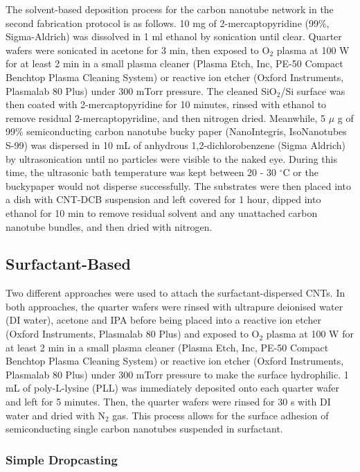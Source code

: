 \documentclass[
  a4paper,
]{scrbook}
\begin{document}
The solvent-based deposition process for the carbon nanotube network in
the second fabrication protocol is as follows. 10 mg of
2-mercaptopyridine (99\%, Sigma-Aldrich) was dissolved in 1 ml ethanol
by sonication until clear. Quarter wafers were sonicated in acetone for
3 min, then exposed to O\(_2\) plasma at 100 W for at least 2 min in a
small plasma cleaner (Plasma Etch, Inc, PE-50 Compact Benchtop Plasma
Cleaning System) or reactive ion etcher (Oxford Instruments, Plasmalab
80 Plus) under 300 mTorr pressure. The cleaned SiO\(_2\)/Si surface was
then coated with 2-mercaptopyridine for 10 minutes, rinsed with ethanol
to remove residual \(2\)-mercaptopyridine, and then nitrogen dried.
Meanwhile, 5 \(\mu\) g of 99\% semiconducting carbon nanotube bucky
paper (NanoIntegris, IsoNanotubes S-99) was dispersed in 10 mL of
anhydrous 1,2-dichlorobenzene (Sigma Aldrich) by ultrasonication until
no particles were visible to the naked eye. During this time, the
ultrasonic bath temperature was kept between 20 - 30 \(^\circ\)C or the
buckypaper would not disperse successfully. The substrates were then
placed into a dish with CNT-DCB suspension and left covered for 1 hour,
dipped into ethanol for 10 min to remove residual solvent and any
unattached carbon nanotube bundles, and then dried with nitrogen.

\hypertarget{surfactant-based}{%
\subsection{Surfactant-Based}\label{surfactant-based}}

Two different approaches were used to attach the surfactant-dispersed
CNTs. In both approaches, the quarter wafers were rinsed with ultrapure
deionised water (DI water), acetone and IPA before being placed into a
reactive ion etcher (Oxford Instruments, Plasmalab 80 Plus) and exposed
to O\(_2\) plasma at 100 W for at least 2 min in a small plasma cleaner
(Plasma Etch, Inc, PE-50 Compact Benchtop Plasma Cleaning System) or
reactive ion etcher (Oxford Instruments, Plasmalab 80 Plus) under 300
mTorr pressure to make the surface hydrophilic. 1 mL of poly-L-lysine
(PLL) was immediately deposited onto each quarter wafer and left for 5
minutes. Then, the quarter wafers were rinsed for 30 s with DI water and
dried with N\(_2\) gas. This process allows for the surface adhesion of
semiconducting single carbon nanotubes suspended in surfactant.

\hypertarget{simple-dropcasting}{%
\subsubsection*{Simple Dropcasting}\label{simple-dropcasting}}
\end{document}
